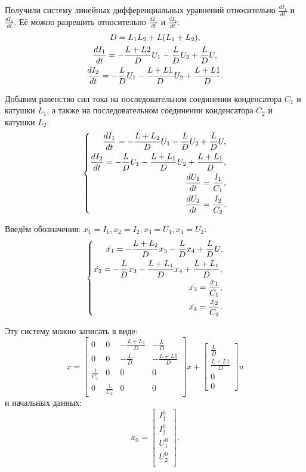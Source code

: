 \documentclass[11pt]{article}
\begin{document}
Получили систему линейных дифференциальных уравнений относительно $\frac{dI_1}{dt}$ и  $\frac{dI_2}{dt}$. Её можно разрешить относительно $\frac{dI_1}{dt}$ и  $\frac{dI_2}{dt}$:
\begin{gather}
D = L_1 L_2 + L(L_1 + L_2), \notag \\
\frac{dI_1}{dt} = -\frac{L+L2}{D}U_1 - \frac{L}{D}U_2 + \frac{L}{D}U, \notag \\
\frac{dI_2}{dt} = -\frac{L}{D}U_1 - \frac{L+L1}{D}U_2 + \frac{L+L1}{D}. \notag
\end{gather}

Добавим равенство сил тока на последовательном соединении конденсатора $C_1$ и катушки $L_1$, а также на последовательном соединении конденсатора $C_2$ и катушки $L_2$:
\begin{gather}
\left\{
\begin{aligned}
\frac{dI_1}{dt} = -\frac{L+L_2}{D}U_1 - \frac{L}{D}U_2 + \frac{L}{D}U, \notag \\
\frac{dI_2}{dt} = -\frac{L}{D}U_1 - \frac{L+L_1}{D}U_2 + \frac{L+L_1}{D}, \notag \\
\frac{dU_1}{dt} = \frac{I_1}{C_1}, \notag \\
\frac{dU_2}{dt} = \frac{I_2}{C_2}. \notag
\end{aligned}
\right.
\end{gather}

Введём обозначения: $x_1 = I_1, x_2 = I_2, x_3 = U_1, x_4 = U_2$:
\begin{gather}
\left\{
\begin{aligned}
\dot{x_1} = -\frac{L+L_2}{D}x_3 - \frac{L}{D}x_4 + \frac{L}{D}U, \notag \\
\dot{x_2} = -\frac{L}{D}x_3 - \frac{L+L_1}{D}x_4 + \frac{L+L_1}{D}, \notag \\
\dot{x_3} = \frac{x_1}{C_1}, \notag \\
\dot{x_4} = \frac{x_2}{C_2}. \notag
\end{aligned}
\right.
\end{gather}

Эту систему можно записать в виде:
$$
\dot{x} = \begin{bmatrix}
0 & 0 & -\frac{L+L_2}{D} & -\frac{L}{D} \\
0 & 0 & -\frac{L}{D} & -\frac{L+L1}{D} \\
\frac{1}{C_1} & 0 & 0 & 0 \\
0 & \frac{1}{C_2} & 0 & 0
\end{bmatrix} x + 
\begin{bmatrix}
\frac{L}{D} \\
\frac{L+L1}{D} \\
0 \\
0
\end{bmatrix} u
$$
и начальных данных:
$$
x_0 = \begin{bmatrix}
I_1^0 \\
I_2^0 \\
U_1^0 \\
U_2^0 \\
\end{bmatrix}.
$$
\end{document}
